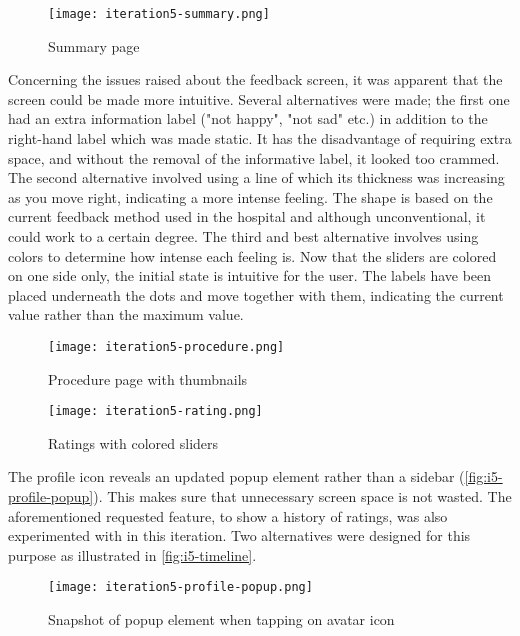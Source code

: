 \begin{figure}
    \centering
    \texttt{[image: iteration5-summary.png]}
    \caption{Summary page}
    \label{fig:i5-summary}
\end{figure}

Concerning the issues raised about the feedback screen, it was apparent that the screen could be made more intuitive. Several alternatives were made; the first one had an extra information label ("not happy", "not sad" etc.) in addition to the right-hand label which was made static. It has the disadvantage of requiring extra space, and without the removal of the informative label, it looked too crammed. The second alternative involved using a line of which its thickness was increasing as you move right, indicating a more intense feeling. The shape is based on the current feedback method used in the hospital and although unconventional, it could work to a certain degree. The third and best alternative involves using colors to determine how intense each feeling is. Now that the sliders are colored on one side only, the initial state is intuitive for the user. The labels have been placed underneath the dots and move together with them, indicating the current value rather than the maximum value.

\begin{figure}
    \centering
    \begin{minipage}{0.45\textwidth}
        \centering
        \texttt{[image: iteration5-procedure.png]}
        \caption{Procedure page with thumbnails}
        \label{fig:i5-procedure}
    \end{minipage}
    \begin{minipage}{0.45\textwidth}
        \centering
        \texttt{[image: iteration5-rating.png]}
        \caption{Ratings with colored sliders}
        \label{fig:i5-rating}
    \end{minipage}
\end{figure}

The profile icon reveals an updated popup element rather than a sidebar (\autoref{fig:i5-profile-popup}). This makes sure that unnecessary screen space is not wasted. The aforementioned requested feature, to show a history of ratings, was also experimented with in this iteration. Two alternatives were designed for this purpose as illustrated in \autoref{fig:i5-timeline}.

\begin{figure}
    \centering
    \texttt{[image: iteration5-profile-popup.png]}
    \caption{Snapshot of popup element when tapping on avatar icon}
    \label{fig:i5-profile-popup}
\end{figure}

